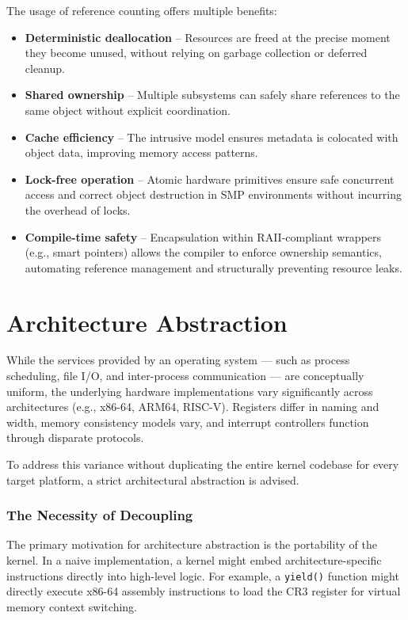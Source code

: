 \documentclass[a4paper,10pt,twoside]{report}
\theoremstyle{definition}
\begin{document}
The usage of reference counting offers multiple benefits:
\begin{itemize}
    \item \textbf{Deterministic deallocation} -- Resources are freed at the precise moment they become unused, without relying on garbage collection or deferred cleanup.
    \item \textbf{Shared ownership} -- Multiple subsystems can safely share references to the same object without explicit coordination.
    \item \textbf{Cache efficiency} -- The intrusive model ensures metadata is colocated with object data, improving memory access patterns.
    \item \textbf{Lock-free operation} -- Atomic hardware primitives ensure safe concurrent access and correct object destruction in SMP environments without incurring the overhead of locks.
    \item \textbf{Compile-time safety} -- Encapsulation within RAII-compliant wrappers (e.g., smart pointers) allows the compiler to enforce ownership semantics, automating reference management and structurally preventing resource leaks.
\end{itemize}

\section{Architecture Abstraction}
\label{sec:arch_abstraction}

While the services provided by an operating system --- such as process scheduling, file I/O, and inter-process communication --- are conceptually uniform, the underlying hardware implementations vary significantly across architectures (e.g., x86-64, ARM64, RISC-V). Registers differ in naming and width, memory consistency models vary, and interrupt controllers function through disparate protocols.

To address this variance without duplicating the entire kernel codebase for every target platform, a strict architectural abstraction is advised. 

\subsubsection{The Necessity of Decoupling}

The primary motivation for architecture abstraction is the portability of the kernel. In a naive implementation, a kernel might embed architecture-specific instructions directly into high-level logic. For example, a \texttt{yield()} function might directly execute x86-64 assembly instructions to load the CR3 register for virtual memory context switching.
\end{document}
